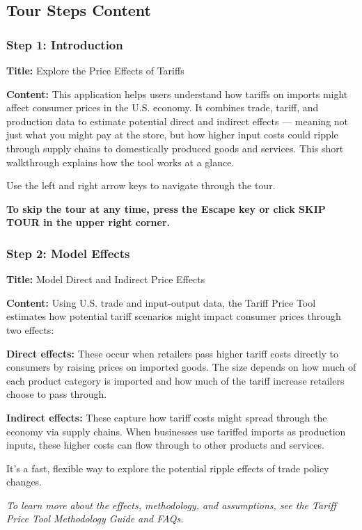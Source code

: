 \documentclass[11pt]{article}
\begin{document}
\subsection{Tour Steps Content}

\subsubsection{Step 1: Introduction}
\textbf{Title:} Explore the Price Effects of Tariffs

\textbf{Content:} This application helps users understand how tariffs on imports might affect consumer prices in the U.S. economy. It combines trade, tariff, and production data to estimate potential direct and indirect effects — meaning not just what you might pay at the store, but how higher input costs could ripple through supply chains to domestically produced goods and services. This short walkthrough explains how the tool works at a glance.

Use the left and right arrow keys to navigate through the tour.

\textbf{To skip the tour at any time, press the Escape key or click SKIP TOUR in the upper right corner.}

\subsubsection{Step 2: Model Effects}
\textbf{Title:} Model Direct and Indirect Price Effects

\textbf{Content:} Using U.S. trade and input-output data, the Tariff Price Tool estimates how potential tariff scenarios might impact consumer prices through two effects:

\textbf{Direct effects:} These occur when retailers pass higher tariff costs directly to consumers by raising prices on imported goods. The size depends on how much of each product category is imported and how much of the tariff increase retailers choose to pass through.

\textbf{Indirect effects:} These capture how tariff costs might spread through the economy via supply chains. When businesses use tariffed imports as production inputs, these higher costs can flow through to other products and services.

It's a fast, flexible way to explore the potential ripple effects of trade policy changes.

\textit{To learn more about the effects, methodology, and assumptions, see the Tariff Price Tool Methodology Guide and FAQs.}
\end{document}
